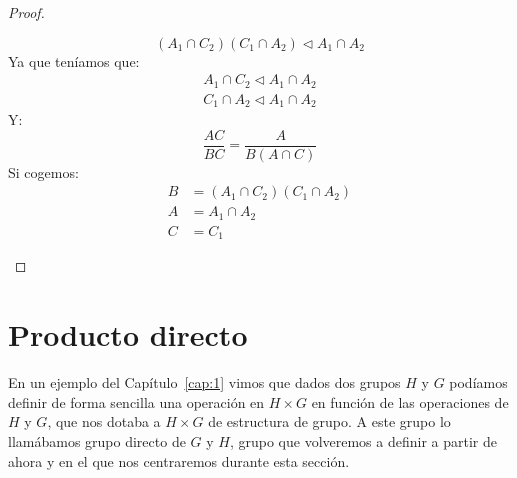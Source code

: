 \begin{teo}
\begin{proof}
\begin{enumerate}
                \begin{figure}[H]
                    \centering
                \end{figure}


                \begin{equation*}
                    (A_1\cap C_2)(C_1\cap A_2) \lhd A_1\cap A_2
                \end{equation*}
                Ya que teníamos que:
                \begin{gather*}
                    A_1\cap C_2 \lhd A_1\cap A_2 \\
                    C_1\cap A_2 \lhd A_1\cap A_2
                \end{gather*}
                Y:
                \begin{equation*}
                    \dfrac{AC}{BC} = \dfrac{A}{B(A\cap C)}
                \end{equation*}
                Si cogemos:
                \begin{align*}
                    B &= (A_1\cap C_2)(C_1\cap A_2) \\
                    A &= A_1\cap A_2 \\
                    C  &= C_1
                \end{align*}
        \end{enumerate}
    \end{proof}
\end{teo}

\section{Producto directo}
En un ejemplo del Capítulo~\ref{cap:1} vimos que dados dos grupos $H$ y $G$ podíamos definir de forma sencilla una operación en $H\times G$ en función de las operaciones de $H$ y $G$, que nos dotaba a $H\times G$ de estructura de grupo. A este grupo lo llamábamos grupo directo de $G$ y $H$, grupo que volveremos a definir a partir de ahora y en el que nos centraremos durante esta sección.

